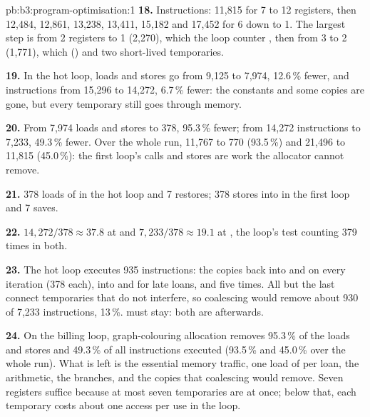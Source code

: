 \begin{solution}{pb:b3:program-optimisation:1}
\textbf{18.} Instructions: 11,815 for 7 to 12 registers, then 12,484, 12,861, 13,238, 13,411, 15,182 and 17,452 for 6 down to 1. The largest step is from 2 registers to 1 (2,270), which  the loop counter , then from 3 to 2 (1,771), which   () and two short-lived temporaries.

\textbf{19.} In the hot loop, loads and stores go from 9,125 to 7,974, 12.6\,\% fewer, and instructions from 15,296 to 14,272, 6.7\,\% fewer: the constants and some copies are gone, but every temporary still goes through memory.

\textbf{20.} From 7,974 loads and stores to 378, 95.3\,\% fewer; from 14,272 instructions to 7,233, 49.3\,\% fewer. Over the whole run, 11,767 to 770 (93.5\,\%) and 21,496 to 11,815 (45.0\,\%): the first loop's  calls and stores are work the allocator cannot remove.

\textbf{21.} 378 loads of  in the hot loop and 7 restores; 378 stores into  in the first loop and 7 saves.

\textbf{22.} $14{,}272/378 \approx 37.8$ at  and $7{,}233/378 \approx 19.1$ at , the loop's test counting 379 times in both.

\textbf{23.} The hot loop executes 935  instructions: the copies back into  and  on every iteration (378 each), into  and  for late loans, and  five times. All but the last connect temporaries that do not interfere, so coalescing would remove about 930 of 7,233 instructions, 13\,\%.  must stay: both are  afterwards.

\textbf{24.} On the billing loop, graph-colouring allocation removes 95.3\,\% of the loads and stores and 49.3\,\% of all instructions executed (93.5\,\% and 45.0\,\% over the whole run). What is left is the essential memory traffic, one load of  per loan, the arithmetic, the branches, and the copies that coalescing would remove. Seven registers suffice because at most seven temporaries are  at once; below that, each  temporary costs about one access per use in the loop.
\end{solution}
